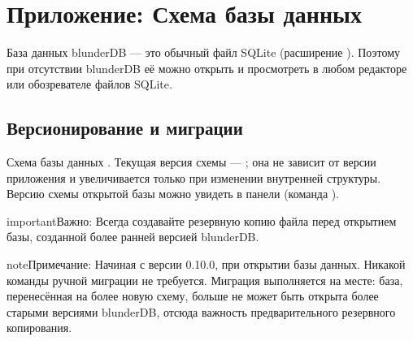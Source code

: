\documentclass[letterpaper,10pt,russian]{sphinxmanual}
\begin{document}
\sphinxstepscope


\section{Приложение: Схема базы данных}
\label{\detokenize{annexe_db_scheme:annexe-schema-de-la-base-de-donnees}}\label{\detokenize{annexe_db_scheme:annexe-db-migration}}\label{\detokenize{annexe_db_scheme::doc}}
\sphinxAtStartPar
База данных blunderDB — это обычный файл SQLite (расширение ). Поэтому при отсутствии blunderDB её можно открыть и просмотреть в любом редакторе или обозревателе файлов SQLite.


\subsection{Версионирование и миграции}
\label{\detokenize{annexe_db_scheme:versionnage-et-migrations}}
\sphinxAtStartPar
Схема базы данных . Текущая версия схемы — ; она не зависит от версии приложения и увеличивается только при изменении внутренней структуры. Версию схемы открытой базы можно увидеть в панели  (команда ).

\begin{sphinxadmonition}{important}{Важно:}
\sphinxAtStartPar
Всегда создавайте резервную копию файла  перед открытием базы, созданной более ранней версией blunderDB.
\end{sphinxadmonition}

\begin{sphinxadmonition}{note}{Примечание:}
\sphinxAtStartPar
Начиная с версии 0.10.0,  при открытии базы данных. Никакой команды ручной миграции не требуется. Миграция выполняется на месте: база, перенесённая на более новую схему, больше не может быть открыта более старыми версиями blunderDB, отсюда важность предварительного резервного копирования.
\end{sphinxadmonition}
\end{document}
